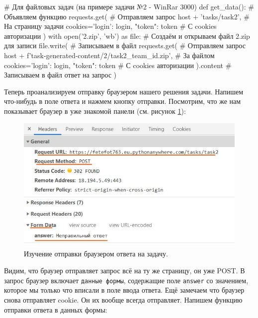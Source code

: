 \documentclass[12pt]{article}
\begin{document}
\begin{pythoncode}
# Для файловых задач (на примере задачи №2 - WinRar 3000)
def get_data():                                   # Объявляем функцию
    requests.get(                                 # Отправляем запрос
        host + 'tasks/task2',                     # На страницу задачи
        cookies={'login': login, "token": token}  # С cookies авторизации
    )
    with open('2.zip', 'wb') as file:             # Создаём и открываем файл 2.zip для записи
        file.write(                               # Записываем в файл
            requests.get(                         # Отправляем запрос
                host + f'task-generated-content/2/task2_{team_id}.zip', # За файлом
                cookies={'login': login, "token": token} # С cookies авторизации
            ).content                             # Записываем в файл ответ на запрос
        )
	\end{pythoncode}

	Теперь проанализируем отправку браузером нашего решения задачи. Напишем что-нибудь в поле ответа и нажмем кнопку отправки. Посмотрим, что же нам показывает браузер в уже знакомой панели (см. рисунок \ref{fig:browser3}):
	
	\begin{figure}[H]
		\includegraphics[width=\linewidth]{BrowserNetworkAnalysis3.jpg}
		\caption{Изучение отправки браузером ответа на задачу.}
	 	\label{fig:browser3}
	\end{figure}	
	
	Видим, что браузер отправляет запрос всё на ту же страницу, он уже POST. В запрос браузер включает \verb|данные формы|, содержащие поле \verb|answer| со значением, которое мы только что вписали в поле ввода ответа. Ещё замечаем что браузер снова отправляет cookie. Он их вообще всегда отправляет.
	\linebreak
	Напишем функцию отправки ответа в данных формы:
\end{document}
